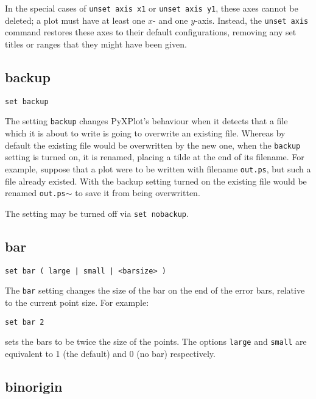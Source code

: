 In the special cases of {\tt unset axis x1} or {\tt unset axis y1}, these axes
cannot be deleted; a plot must have at least one $x$- and one $y$-axis. Instead,
the {\tt unset axis} command restores these axes to their default
configurations, removing any set titles or ranges that they might have been
given.

\subsection{backup}

\begin{verbatim}
set backup
\end{verbatim}

The setting {\tt backup} changes PyXPlot's behaviour when it detects that a file
which it is about to write is going to overwrite an existing file. Whereas by
default the existing file would be overwritten by the new one, when the
{\tt backup} setting is turned on, it is renamed, placing a tilde at the end of
its filename. For example, suppose that a plot were to be written with filename
{\tt out.ps}, but such a file already existed.  With the backup setting turned on
the existing file would be renamed {\tt out.ps$\sim$} to save it from being overwritten.

The setting may be turned off via {\tt set nobackup}.


\subsection{bar}

\begin{verbatim}
set bar ( large | small | <barsize> )
\end{verbatim}

The {\tt bar} setting changes the size of the bar on the end of the error bars,
relative to the current point size.  For example:

\begin{verbatim}
set bar 2
\end{verbatim}

\noindent sets the bars to be twice the size of the points.  The options {\tt large} and
{\tt small} are equivalent to 1 (the default) and 0 (no bar) respectively.

\subsection{binorigin}

